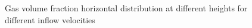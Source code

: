 \documentclass[11pt,a4paper]{article}
\begin{document}
\begin{figure}[H]
    \centering
    \caption[]{Gas volume fraction horizontal distribution at different heights for different inflow velocities}
    \label{fig:alpha_inflow_velocities}
\end{figure}



\end{document}
